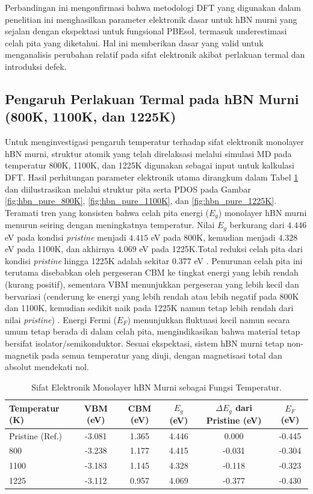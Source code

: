 Perbandingan ini mengonfirmasi bahwa metodologi DFT yang digunakan dalam penelitian ini menghasilkan parameter elektronik dasar untuk hBN murni yang sejalan dengan ekspektasi untuk fungsional PBEsol, termasuk underestimasi celah pita yang diketahui. Hal ini memberikan dasar yang valid untuk menganalisis perubahan relatif pada sifat elektronik akibat perlakuan termal dan introduksi defek.

\subsection{Pengaruh Perlakuan Termal pada hBN Murni (800K, 1100K, dan 1225K)}
\label{subsec:hbn_murni_termal}
Untuk menginvestigasi pengaruh temperatur terhadap sifat elektronik monolayer hBN murni, struktur atomik yang telah direlaksasi melalui simulasi MD pada temperatur 800K, 1100K, dan 1225K digunakan sebagai input untuk kalkulasi DFT. Hasil perhitungan parameter elektronik utama dirangkum dalam Tabel \ref{tab:hbn_murni_suhu} dan diilustrasikan melalui struktur pita serta PDOS pada Gambar \ref{fig:hbn_pure_800K}, \ref{fig:hbn_pure_1100K}, dan \ref{fig:hbn_pure_1225K}. Teramati tren yang konsisten bahwa celah pita energi ($E_g$) monolayer hBN murni menurun seiring dengan meningkatnya temperatur. Nilai $E_g$ berkurang dari $4.446$ eV pada kondisi \textit{pristine} menjadi $4.415$ eV pada 800K, kemudian menjadi $4.328$ eV pada 1100K, dan akhirnya $4.069$ eV pada 1225K.Total reduksi celah pita dari kondisi \textit{pristine} hingga 1225K adalah sekitar $0.377$ eV . Penurunan celah pita ini terutama disebabkan oleh pergeseran CBM ke tingkat energi yang lebih rendah (kurang positif), sementara VBM menunjukkan pergeseran yang lebih kecil dan bervariasi (cenderung ke energi yang lebih rendah atau lebih negatif pada 800K dan 1100K, kemudian sedikit naik pada 1225K namun tetap lebih rendah dari nilai \textit{pristine}) . Energi Fermi ($E_F$) menunjukkan fluktuasi kecil namun secara umum tetap berada di dalam celah pita, mengindikasikan bahwa material tetap bersifat isolator/semikonduktor. Sesuai ekspektasi, sistem hBN murni tetap non-magnetik pada semua temperatur yang diuji, dengan magnetisasi total dan absolut mendekati nol. 
\begin{table}[h!]
  \centering
  \caption{Sifat Elektronik Monolayer hBN Murni sebagai Fungsi Temperatur.}
  \label{tab:hbn_murni_suhu}
  \begin{tabular}{lccccc}
    \toprule
    Temperatur (K) & VBM (eV) & CBM (eV) & $E_g$ (eV) & $\Delta E_g$ dari Pristine (eV) & $E_F$ (eV) \\
    \midrule
    Pristine (Ref.) & -3.081 &  1.365 & 4.446 &  0.000 & -0.445 \\
    800             & -3.238 &  1.177 & 4.415 & -0.031 & -0.304 \\
    1100   
          & -3.183 &  1.145 & 4.328 & -0.118 & -0.323 \\
    1225            & -3.112 &  0.957 & 4.069 & -0.377 & -0.430 \\
    \bottomrule
  \end{tabular}
\end{table}


